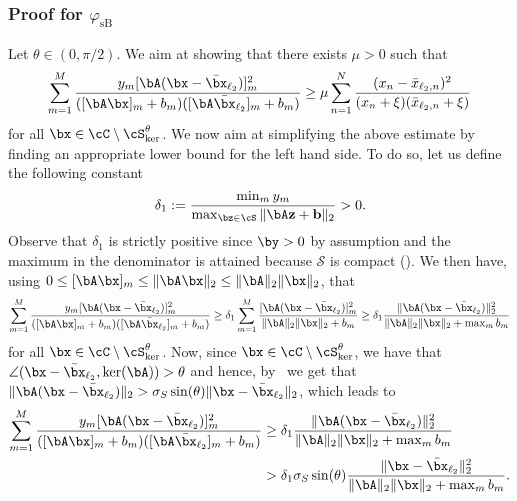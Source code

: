 \documentclass[11pt]{amsart}
\begin{document}
\subsubsection{\texorpdfstring{Proof for $\varphi_{\mathrm{sB}}$}{Smoothed Burgs entropy varphisb}}\label{proof: brsc}

Let $\theta\in(0,\pi/2)$. We aim at showing that there exists $\mu>0$ such that
\begin{equation}\label{eq:RRSC_for_KL_1}
\sum_{m =1}^{M} \frac{y_{m}[\bA(\bx-\bar\bx_{\ell_2})]_m^2}{([\bA\bx]_m+b_m)([\bA\bar\bx_{\ell_2}]_m+b_m)}
\geq 
\mu \sum_{n=1}^N \frac{(x_n-\bar x_{\ell_2,n})^2}{(x_n + \xi)(\bar x_{\ell_2,n} + \xi )}
\end{equation}
for all $\bx \in \cC\setminus\cS_{\ker}^\theta$.
We now aim at simplifying the above estimate by finding an appropriate lower bound for the left hand side. To do so, let us define the following constant
$$
\delta_1:= \frac{\min_{m}y_m}{\max_{\bz\in \cS} \|\bA\mathbf{z}+\mathbf{b}\|_2}>0.
$$
Observe that $\delta_1$ is strictly positive since $\by>0$ by assumption and the maximum in the denominator is attained because $\mathcal{S}$ is compact (). We then have, using  $0 \leq [\bA\bx]_m \leq \|\bA\bx\|_2 \leq \|\bA\|_2 \|\bx\|_2$, that
\begin{equation*}\label{eq:rrsc before lemma}
\begin{aligned}
\sum_{m =1}^{M} \frac{y_{m}[\bA(\bx-\bar\bx_{\ell_2})]_m^2}{([\bA\bx]_m+b_m)([ \bA\bar\bx_{\ell_2}]_m+b_m)}\geq
\delta_1\sum_{m =1}^{M} \frac{[\bA(\bx-\bar\bx_{\ell_2})]_{m}^2}{\|\bA\|_2\|\bx\|_2+b_m}\geq\delta_1\frac{\|\bA(\bx-\bar\bx_{\ell_2})\|_2^2}{\|\bA\|_2\|\bx\|_2+\max_mb_m}
\end{aligned}
\end{equation*}
for all $\bx\in\cC\setminus\cS_{\ker}^\theta$.  Now, since $\bx\in\cC\setminus\cS_{\ker}^\theta$, we have that $\angle(\bx-\bar\bx_{\ell_2},\ker(\bA))> \theta$ and hence, by~ we get that $\|\bA(\bx-\bar\bx_{\ell_2})\|_2> \sigma_S\sin(\theta)\|\bx-\bar\bx_{\ell_2}\|_2$, which leads to
\begin{equation}\label{eq:rrsc_proof_final_estimate}
\begin{aligned}
\sum_{m =1}^{M} \frac{y_{m}[\bA(\bx-\bar\bx_{\ell_2})]_{m}^2}{([\bA\bx]_{m}+ b_m)([\bA\bar\bx_{\ell_2}]_{m}+b_m)}
&\geq
\delta_1\frac{\|\bA(\bx-\bar\bx_{\ell_2})\|_2^2}{\|\bA\|_2\|\bx\|_2+\max_m b_m}\\
&> 
\delta_1\sigma_S\sin(\theta)\frac{\|\bx-\bar\bx_{\ell_2}\|_2^2}{\|\bA\|_2\|\bx\|_2+\max_m b_m}.
\end{aligned}
\end{equation}
\end{document}
